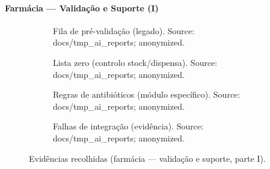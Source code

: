 \paragraph{Farmácia — Validação e Suporte (I)}
\begin{figure}[htbp]
    \centering
    \begin{subfigure}[t]{0.48\textwidth}
        \centering
        \caption{Fila de pré-validação (legado). Source: docs/tmp\_ai\_reports; anonymized.}
        \label{fig:baseline_validation_queue_v1}
    \end{subfigure}\hfill
    \begin{subfigure}[t]{0.48\textwidth}
        \centering
        \caption{Lista zero (controlo stock/dispensa). Source: docs/tmp\_ai\_reports; anonymized.}
        \label{fig:baseline_lista_zero_v1}
    \end{subfigure}
    \begin{subfigure}[t]{0.48\textwidth}
        \centering
        \caption{Regras de antibióticos (módulo específico). Source: docs/tmp\_ai\_reports; anonymized.}
        \label{fig:baseline_antibiotics_rules_v1}
    \end{subfigure}\hfill
    \begin{subfigure}[t]{0.48\textwidth}
        \centering
        \caption{Falhas de integração (evidência). Source: docs/tmp\_ai\_reports; anonymized.}
        \label{fig:baseline_integration_failures_v1}
    \end{subfigure}
    \caption{Evidências recolhidas (farmácia — validação e suporte, parte I).}
\end{figure}

